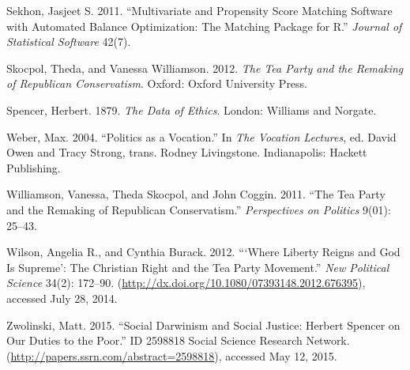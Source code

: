 \documentclass[12pt,]{article}
\begin{document}
Sekhon, Jasjeet S. 2011. ``Multivariate and Propensity Score Matching
Software with Automated Balance Optimization: The Matching Package for
R.'' \emph{Journal of Statistical Software} 42(7).

Skocpol, Theda, and Vanessa Williamson. 2012. \emph{The Tea Party and
the Remaking of Republican Conservatism}. Oxford: Oxford University
Press.

Spencer, Herbert. 1879. \emph{The Data of Ethics}. London: Williams and
Norgate.

Weber, Max. 2004. ``Politics as a Vocation.'' In \emph{The Vocation
Lectures}, ed. David Owen and Tracy Strong, trans. Rodney Livingstone.
Indianapolis: Hackett Publishing.

Williamson, Vanessa, Theda Skocpol, and John Coggin. 2011. ``The Tea
Party and the Remaking of Republican Conservatism.'' \emph{Perspectives
on Politics} 9(01): 25--43.

Wilson, Angelia R., and Cynthia Burack. 2012. ```Where Liberty Reigns
and God Is Supreme': The Christian Right and the Tea Party Movement.''
\emph{New Political Science} 34(2): 172--90.
(\url{http://dx.doi.org/10.1080/07393148.2012.676395}), accessed July
28, 2014.

Zwolinski, Matt. 2015. ``Social Darwinism and Social Justice: Herbert
Spencer on Our Duties to the Poor.'' ID 2598818 Social Science Research
Network. (\url{http://papers.ssrn.com/abstract=2598818}), accessed May
12, 2015.
\end{document}
